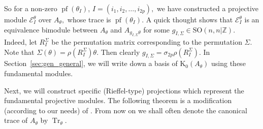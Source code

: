 \documentclass[9pt, BCOR=2mm]{amsart}
\numberwithin{equation}{section}
\numberwithin{equation}{section}
\newcommand{\Z}{{\mathbb{Z}}}
\newcommand{\pf}{{\operatorname{pf}}}
\newcommand{\K}{\mathrm{K}} %
\DeclareMathOperator{\Tr}{Tr}
\begin{document}
So for a non-zero $\pf(\theta_{I})$, $I=\left(i_{1}, i_{2}, \ldots, i_{2 p}\right),$ we have constructed a projective module $\mathcal{E}_{I}^{\theta}$ over $A_\theta,$ whose trace is $\pf(\theta_{I}).$ A quick thought shows that $\mathcal{E}_{I}^{\theta}$ is an equivalence bimodule between $A_\theta$ and $A_{g_{I, \Sigma}\theta}$ for some $g_{I, \Sigma} \in \mathrm{SO}(n, n|\Z).$ Indeed, let $R_{I}^{\Sigma}$ be the permutation matrix corresponding to the permutation $\Sigma$. Note that $\Sigma(\theta) = \rho\left(R_{I}^{\Sigma}\right)\theta.$    Then clearly $g_{I, \Sigma}=\sigma_{2 p}  \rho\left(R_{I}^{\Sigma}\right).$ In Section~\ref{sec:gen_general}, we will write down a basis of $\K_0(A_\theta)$ using these fundamental modules.



	
Next, we will construct specific (Rieffel-type) projections which represent the fundamental projective modules. The following theorem is a modification (according to our needs) of \cite[Theorem 3.13]{CH21}. From now on we shall often denote the canonical trace of $A_\theta$ by $\Tr_\theta.$ 
\end{document}
